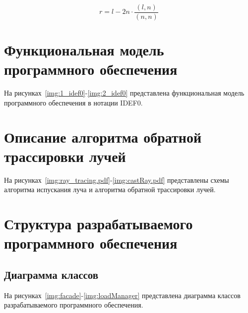 \begin{equation}
	\label{reflect_ray}
	r = l - 2 n \cdot \frac{(l, n)}{(n, n)}
\end{equation}

\clearpage
\section{Функциональная модель программного обеспечения}
На рисунках~\ref{img:1_idef0}-\ref{img:2_idef0} представлена функциональная модель программного обеспечения в нотации IDEF0.

\FloatBarrier
{}
\FloatBarrier
{}
\FloatBarrier

\clearpage
\section{Описание алгоритма обратной трассировки лучей}
На рисунках~\ref{img:ray_tracing.pdf}-\ref{img:castRay.pdf} представлены схемы алгоритма испускания луча и алгоритма обратной трассировки лучей.
\FloatBarrier
{}
\FloatBarrier
{}
\FloatBarrier


\clearpage
\section{Структура разрабатываемого программного обеспечения}
\subsection{Диаграмма классов}
На рисунках~\ref{img:facade}-\ref{img:loadManager} представлена диаграмма классов разрабатываемого программного обеспечения.
\FloatBarrier
{}
\FloatBarrier
{}
\FloatBarrier
{}
\FloatBarrier

